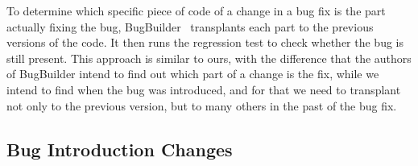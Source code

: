 
To determine which specific piece of code of a change in a bug fix is the part actually fixing the bug, BugBuilder~\cite{jiang2021extracting} transplants each part to the previous versions of the code. It then runs the regression test to check whether the bug is still present. This approach is similar to ours, with the difference that the authors of BugBuilder intend to find out which part of a change is the fix, while we intend to find when the bug was introduced, and for that we need to transplant not only to the previous version, but to many others in the past of the bug fix.





\subsection{Bug Introduction Changes}

